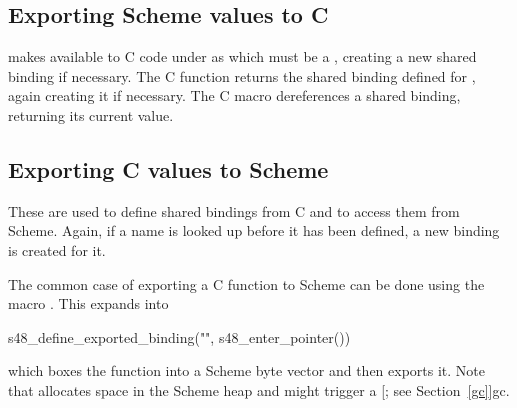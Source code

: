 \subsection{Exporting Scheme values to C}

\begin{protos}
\end{protos}

\begin{protos}
\end{protos}

\noindent{} makes  available to C code
 under as  which must be a , creating a new shared
 binding if necessary.
The C function  returns the shared binding
 defined for , again creating it if necessary.
The C macro  dereferences a shared binding,
 returning its current value.

\subsection{Exporting C values to Scheme}

\begin{protos}
\end{protos}

\begin{protos}
\end{protos}

\noindent These are used to define shared bindings from C and to access them
 from Scheme.
Again, if a name is looked up before it has been defined, a new binding is
 created for it.

The common case of exporting a C function to Scheme can be done using
 the macro .
This expands into
\begin{example}
s48\_define\_exported\_binding("",
                               s48\_enter\_pointer())
\end{example}

\noindent which boxes the function into a Scheme byte vector and then
 exports it.
Note that  allocates space in the Scheme heap
 and might trigger a 
 [; see Section~\ref{gc}]{gc}.

